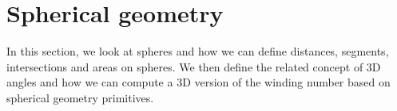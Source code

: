 \section{Spherical geometry}
In this section, we look at spheres and how we can define distances, segments, intersections and areas on spheres. We then define the related concept of 3D angles and how we can compute a 3D version of the winding number based on spherical geometry primitives.





